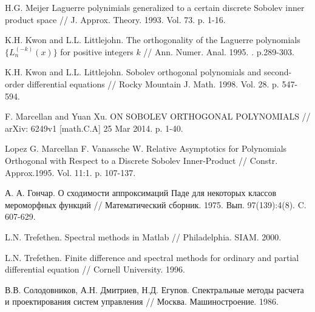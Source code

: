 \begin{thebibliography}{999}

 H.G. Meijer Laguerre polynimials generalized to a certain discrete Sobolev inner product space // J. Approx. Theory. 1993. Vol. 73. p. 1-16.




 K.H. Kwon and L.L. Littlejohn. The orthogonality of the Laguerre polynomials $\{L_n^{(-k)}(x)\}$ for positive integers $k$ // Ann. Numer. Anal. 1995. . p.289-303.




 K.H. Kwon and L.L. Littlejohn. Sobolev orthogonal polynomials and second-order differential equations // Rocky Mountain J. Math. 1998. Vol. 28. p. 547-594.




 F. Marcellan and Yuan Xu. ON SOBOLEV ORTHOGONAL POLYNOMIALS // arXiv: 6249v1 [math.C.A] 25 Mar 2014. p. 1-40.




 Lopez G. Marcellan F. Vanassche W. Relative Asymptotics for Polynomials Orthogonal with Respect to a Discrete Sobolev Inner-Product // Constr. Approx.1995. Vol. 11:1. p. 107-137.




 А. А. Гончар. О сходимости аппроксимаций Паде для некоторых классов мероморфных функций // Математический сборник. 1975. Вып. 97(139):4(8). C. 607-629.




 L.N. Trefethen. Spectral methods in Matlab // Philadelphia. SIAM. 2000.




 L.N. Trefethen. Finite difference and spectral methods for ordinary and partial differential equation // Cornell University. 1996.




 В.В. Солодовников, А.Н. Дмитриев, Н.Д. Егупов. Спектральные методы расчета и проектирования систем управления // Москва. Машиностроение. 1986.




\end{thebibliography}
